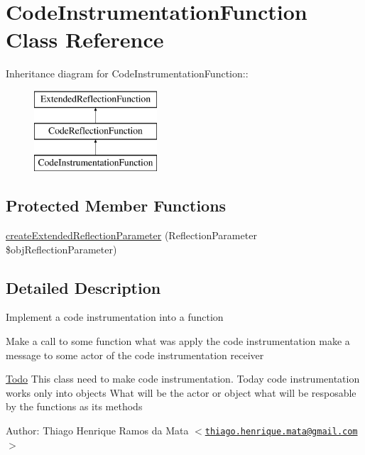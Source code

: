 \hypertarget{class_code_instrumentation_function}{
\section{CodeInstrumentationFunction Class Reference}
\label{class_code_instrumentation_function}
}
Inheritance diagram for CodeInstrumentationFunction::\begin{figure}[H]
\begin{center}
\leavevmode
\includegraphics[height=3cm]{class_code_instrumentation_function}
\end{center}
\end{figure}
\subsection*{Protected Member Functions}
\begin{CompactItemize}
\item 
\hyperlink{class_code_instrumentation_function_98ceb248f2b535a3a83ac2e7990e0c1f}{createExtendedReflectionParameter} (ReflectionParameter \$objReflectionParameter)
\end{CompactItemize}


\subsection{Detailed Description}
Implement a code instrumentation into a function

Make a call to some function what was apply the code instrumentation make a message to some actor of the code instrumentation receiver

\begin{Desc}
\item[\hyperlink{todo__todo000001}{Todo}]This class need to make code instrumentation. Today code instrumentation works only into objects  What will be the actor or object what will be resposable by the functions as its methods\end{Desc}
\begin{Desc}
\item[Author:]Thiago Henrique Ramos da Mata $<$\href{mailto:thiago.henrique.mata@gmail.com}{\tt thiago.henrique.mata@gmail.com}$>$ \end{Desc}


